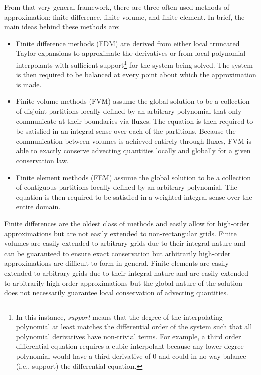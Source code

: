 \documentclass[12pt]{../UWMadThesis}
\begin{document}
From that very general framework, there are three often used methods of approximation: finite difference, finite volume, and finite element.
In brief, the main ideas behind these methods are:
\begin{itemize}[topsep=-0.5\parskip]
	\item{Finite difference methods (FDM) are derived from either local truncated Taylor expansions to approximate the derivatives or from local polynomial interpolants with sufficient support\footnote{In this instance, \emph{support} means that the degree of the interpolating polynomial at least matches the differential order of the system such that all polynomial derivatives have non-trivial terms.  For example, a third order differential equation requires a cubic interpolant because any lower degree polynomial would have a third derivative of $0$ and could in no way balance (i.e., support) the differential equation.} for the system being solved. The system is then required to be balanced at every point about which the approximation is made.}
    \item{Finite volume methods (FVM) assume the global solution to be a collection of disjoint partitions locally defined by an arbitrary polynomial that only communicate at their boundaries via fluxes. The equation is then required to be satisfied in an integral-sense over each of the partitions. Because the communication between volumes is achieved entirely through fluxes, FVM is able to exactly conserve advecting quantities locally and globally for a given conservation law.}
    \item{Finite element methods (FEM) assume the global solution to be a collection of contiguous partitions locally defined by an arbitrary polynomial. The equation is then required to be satisfied in a weighted integral-sense over the entire domain.}
\end{itemize}
Finite differences are the oldest class of methods and easily allow for high-order approximations but are not easily extended to non-rectangular grids.
Finite volumes are easily extended to arbitrary grids due to their integral nature and can be guaranteed to ensure exact conservation but arbitrarily high-order approximations are difficult to form in general.
Finite elements are easily extended to arbitrary grids due to their integral nature and are easily extended to arbitrarily high-order approximations but the global nature of the solution does not necessarily guarantee local conservation of advecting quantities.
\end{document}
